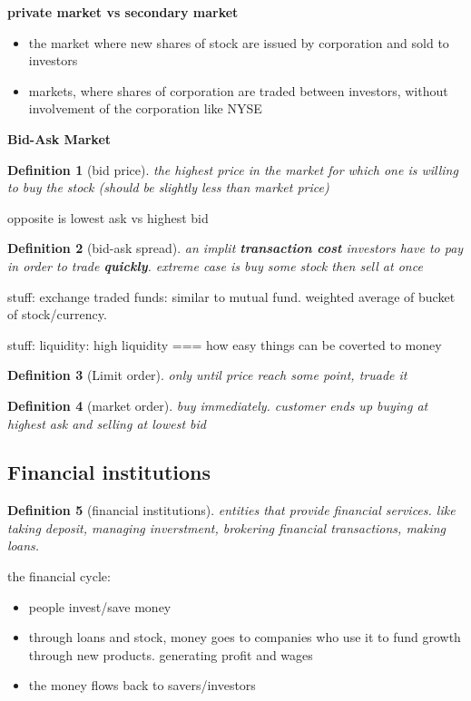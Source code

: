 \documentclass[10pt]{article}
\theoremstyle{break}
\newtheorem{defn}{Definition}[subsection]
\begin{document}
\textbf{private market vs secondary market}
\begin{itemize}
    \item the market where new shares of stock are issued by corporation and sold to investors 
    \item markets, where shares of corporation are traded between investors, without involvement of the corporation like NYSE
\end{itemize}

\textbf{Bid-Ask Market}
\begin{defn}[bid price]
    the highest price in the market for which one is willing to buy the stock (should be slightly less than market price)
\end{defn}
opposite is lowest ask vs highest bid

\begin{defn}[bid-ask spread]
    an implit \textbf{transaction cost} investors have to pay in order to trade \textbf{quickly}.
    extreme case is buy some stock then sell at once
\end{defn}
stuff: exchange traded funds: similar to mutual fund. weighted average of bucket of stock/currency. 

stuff: liquidity: high liquidity === how easy things can be coverted to money

\begin{defn}[Limit order]
    only until price reach some point, truade it 
\end{defn}

\begin{defn}[market order]
    buy immediately. customer ends up buying at highest ask and selling at lowest bid 
\end{defn}

\subsection{Financial institutions}
\begin{defn}[financial institutions]
    entities that provide financial services. like taking deposit, managing inverstment, brokering financial transactions, making loans.
\end{defn}

the financial cycle:
\begin{itemize}
    \item people invest/save money 
    \item through loans and stock, money goes to companies who use it to fund growth through new products. generating profit and wages 
    \item the money flows back to savers/investors
\end{itemize}
\end{document}
